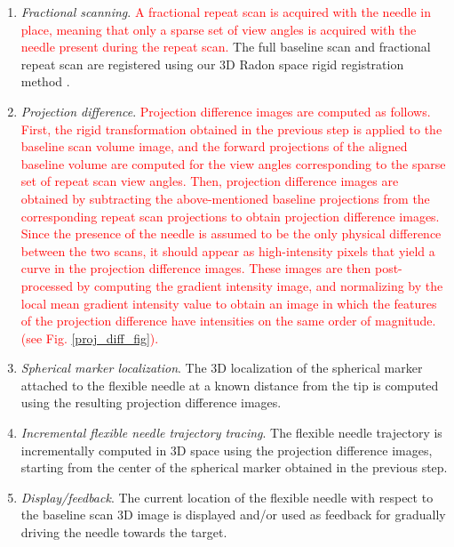 \begin{enumerate}
\item \textit{Fractional scanning}.  \textcolor{red}{A fractional repeat scan is acquired with the needle in place, meaning that only a sparse set of view angles is acquired with the needle present during the repeat scan.} The full baseline scan and fractional repeat scan are registered using our 3D Radon space rigid registration method \cite{medan2017sparse}. \\[0.05ex]
\item \textit{Projection difference}. \textcolor{red}{Projection difference images are computed as follows. First, the rigid transformation obtained in the previous step is applied to the baseline scan volume image, and the forward projections of the aligned baseline volume are computed for the view angles corresponding to the sparse set of repeat scan view angles. Then, projection difference images are obtained by subtracting the above-mentioned baseline projections from the corresponding repeat scan projections to obtain projection difference images. Since the presence of the needle is assumed to be the only physical difference between the two scans, it should appear as high-intensity pixels that yield a curve in the projection difference images. These images are then post-processed by computing the gradient intensity image, and normalizing by the local mean gradient intensity value to obtain an image in which the features of the projection difference have intensities on the same order of magnitude. (see Fig. \ref{proj_diff_fig}).} \\[0.05ex]
\item \textit{Spherical marker localization}. The 3D localization of the spherical marker attached to the flexible needle at a known distance from the tip is computed using the resulting projection difference images.\\[0.1ex]
\item \textit{Incremental flexible needle trajectory tracing}. The flexible needle trajectory is incrementally computed in 3D space using the projection difference images, starting from the center of the spherical marker obtained in the previous step. \\[0.05ex]
\item \textit{Display/feedback}. The current location of the flexible needle with respect to the baseline scan 3D image is displayed and/or used as feedback for gradually driving the needle towards the target.
\end{enumerate}
